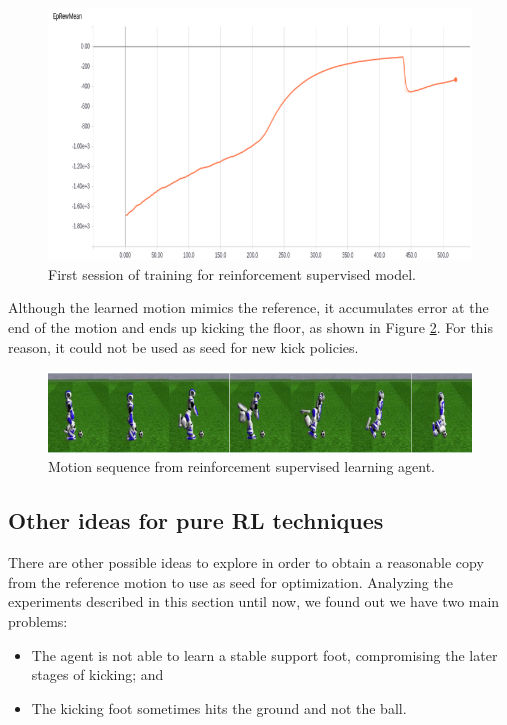\begin{figure}[H]
	\centering
	\includegraphics[width=1.0\textwidth]{Cap6/rlsuprewardcurves.eps}
	\caption{First session of training for reinforcement supervised model.}
	\label{fig:rlsupcurves}
\end{figure}

Although the learned motion mimics the reference, it accumulates error at the end of the motion and ends up kicking the floor, as shown in Figure \ref{fig:rlsupmotionsequence}. For this reason, it could not be used as seed for new kick policies.

\begin{figure}[H]
	\centering
	\includegraphics[width=1.0\textwidth]{Cap6/rlsupmotionsequence.eps}
	\caption{Motion sequence from reinforcement supervised learning agent.}
	\label{fig:rlsupmotionsequence}
\end{figure}

\subsection{Other ideas for pure RL techniques}

There are other possible ideas to explore in order to obtain a reasonable copy from the reference motion to use as seed for optimization. Analyzing the experiments described in this section until now, we found out we have two main problems:

\begin{itemize}
	\item The agent is not able to learn a stable support foot, compromising the later stages of kicking; and
	\item The kicking foot sometimes hits the ground and not the ball.
\end{itemize}

